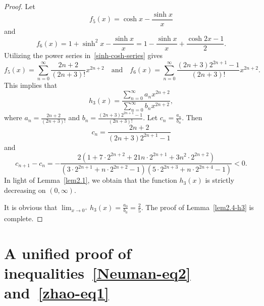 \documentclass[reqno,a4paper]{amsart}
\numberwithin{equation}{section}
\theoremstyle{plain}
\theoremstyle{remark}
\begin{document}
\begin{proof}
Let
\begin{equation*}
f_5(x)=\cosh x-\frac{\sinh x}x
\end{equation*}
and
\begin{equation*}
f_6(x)=1+\sinh^2x-\frac{\sinh x}x=1-\frac{\sinh x}x+\frac{\cosh2x-1}2.
\end{equation*}
Utilizing the power series in~\eqref{sinh-cosh-series} gives
\begin{equation*}
f_5(x)=\sum_{n=0}^{\infty}\frac{2n+2}{(2n+3)!}x^{2n+2}\quad\text{and}\quad
f_6(x)=\sum_{n=0}^{\infty}\frac{(2n+3)2^{2n+1}-1}{(2n+3)!}x^{2n+2}.
\end{equation*}
This implies that
\begin{equation}\label{lem2.4-h3-f5-f6-eq}
h_3(x)=\frac{\sum_{n=0}^{\infty}a_nx^{2n+2}}
{\sum_{n=0}^{\infty}b_nx^{2n+2}},
\end{equation}
where $a_n=\frac{2n+2}{(2n+3)!}$ and $b_n=\frac{(2n+3)2^{2n+1}-1}{(2n+3)!}$.
Let $c_n=\frac{a_n}{b_n}$. Then
\begin{equation*}
c_n=\frac{2n+2}{(2n+3)2^{2n+1}-1}
\end{equation*}
and
\begin{equation*}
c_{n+1}-c_n=-\frac{2(1+7\cdot2^{2n+2}+21n\cdot2^{2n+1}+3n^2\cdot2^{2n+2})}
{(3\cdot2^{2n+1}+n\cdot2^{2n+2}-1)(5\cdot2^{2n+3}+n\cdot2^{2n+4}-1)}<0.
\end{equation*}
In light of Lemma~\ref{lem2.1}, we obtain that the function $h_3(x)$ is strictly decreasing on $(0,\infty)$.
\par
It is obvious that $\lim_{x\to0^+}h_3(x)=\frac{a_0}{b_0}=\frac25$.
The proof of Lemma~\ref{lem2.4-h3} is complete.
\end{proof}

\section{A unified proof of inequalities~\eqref{Neuman-eq2} and~\eqref{zhao-eq1}}
\end{document}
